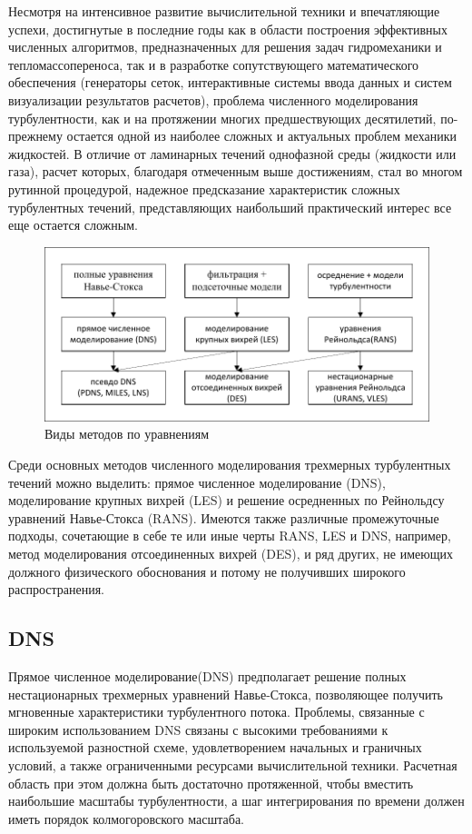 	Несмотря на интенсивное развитие вычислительной техники и впечатляющие успехи, достигнутые в последние годы как в области построения эффективных численных алгоритмов, предназначенных для решения задач гидромеханики и тепломассопереноса, так и в разработке сопутствующего математического обеспечения (генераторы сеток, интерактивные системы ввода данных и систем визуализации результатов расчетов), проблема численного моделирования турбулентности, как и на протяжении многих предшествующих десятилетий, по-прежнему остается одной из наиболее сложных и актуальных проблем механики жидкостей. В отличие от ламинарных течений однофазной среды (жидкости или газа), расчет которых, благодаря отмеченным выше достижениям, стал во многом рутинной процедурой, надежное предсказание характеристик сложных турбулентных течений, представляющих наибольший практический интерес все еще остается сложным.
	\begin{figure}[H]
		\centering
		\includegraphics[width=0.9\linewidth]{../Assets/СхемаМетодов}
		\caption{Виды методов по уравнениям}
		\label{fig:cheme}
	\end{figure}
	
	Среди основных методов численного моделирования трехмерных турбулентных течений можно выделить: прямое численное моделирование (DNS), моделирование крупных вихрей (LES) и решение осредненных по Рейнольдсу уравнений Навье-Стокса (RANS). Имеются также различные промежуточные подходы, сочетающие в себе те или иные черты RANS, LES и DNS, например, метод моделирования отсоединенных вихрей (DES), и ряд других, не имеющих должного физического обоснования и потому не получивших широкого распространения.

\subsection{DNS}
	
	Прямое численное моделирование(DNS) предполагает решение полных нестационарных трехмерных уравнений Навье-Стокса, позволяющее получить мгновенные характеристики турбулентного потока. Проблемы, связанные с широким использованием DNS связаны с высокими требованиями к используемой разностной схеме, удовлетворением начальных и граничных условий, а также ограниченными ресурсами вычислительной техники. Расчетная область при этом должна быть достаточно протяженной, чтобы вместить наибольшие масштабы турбулентности, а шаг интегрирования по времени должен иметь порядок колмогоровского масштаба.
	
